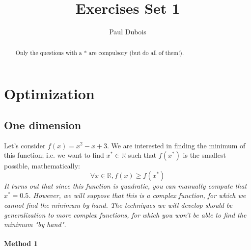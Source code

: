 \documentclass[]{article}
\title{Exercises Set 1}
\author{Paul Dubois}
\newcommand{\R}{\mathbb{R}}
\begin{document}
	
	\maketitle
	
	\begin{abstract}
		Only the questions with a * are compulsory (but do all of them!).
	\end{abstract}
	
	\section{Optimization}
	\subsection{One dimension}
	Let's consider $f(x) = x^2-x+3$.
	We are interested in finding the minimum of this function; 
	i.e. we want to find $x^* \in \R$ such that $f(x^*)$ is the smallest possible, mathematically:
	$$\forall x\in \R, f(x) \geq f(x^*)$$
	\textit{It turns out that since this function is quadratic, you can manually compute that $x^*=0.5$.
		However, we will suppose that this is a complex function, for which we cannot find the minimum by hand.
		The techniques we will develop should be generalization to more complex functions, for which you won't be able to find the minimum "by hand".}
	
	\paragraph{Method 1}
	
	
	
	
	
	
	
	
\end{document}
